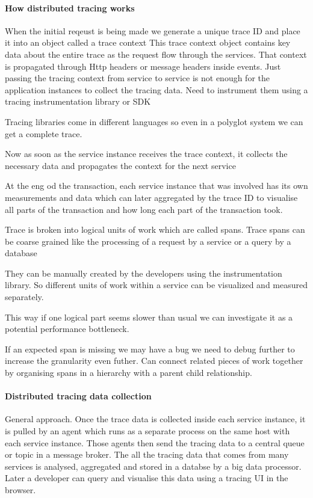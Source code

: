 \documentclass[a4paper, 11pt]{book}
\begin{document}
{    \paragraph{How distributed tracing works}
    When the initial reqeust is being made we generate a unique trace ID and place it into an object called a trace context
    This trace context object contains key data about the entire trace as the request flow through the services.
    That context is propagated through Http headers or message headers inside events.
    Just passing the tracing context from service to service is not enough for the application instances to collect the tracing data.
    Need to instrument them using a tracing instrumentation library or SDK

    Tracing libraries come in different languages so even in a polyglot system we can get a complete trace.

    Now as soon as the service instance receives the trace context, it collects the necessary data and propagates the context for the next service

    At the eng od the transaction, each service instance that was involved has its own measurements and data which can later aggregated by the trace ID to visualise all parts of the transaction and how long each part of the transaction took.

    Trace is broken into logical units of work which are called spans.
    Trace spans can be coarse grained like the processing of a request by a service or a query by a database

    They can be manually created by the developers using the instrumentation library.
    So different units of work within a service can be visualized and measured separately.

    This way if one logical part seems slower than usual we can investigate it as a potential performance bottleneck.

    If an expected span is missing we may have a bug we need to debug further to increase the granularity even futher.
    Can connect related pieces of work together by organising spans in a hierarchy with a parent child relationship.

    \paragraph{Distributed tracing data collection}
    General approach.
    Once the trace data is collected inside each service instance, it is pulled by an agent which runs as a separate process on the same host with each service instance.
    Those agents then send the tracing data to a central queue or topic in a message broker.
    The all the tracing data that comes from many services is analysed, aggregated and stored in a databse by a big data processor.
    Later a developer can query and visualise this data using a tracing UI in the browser.

}
\end{document}
